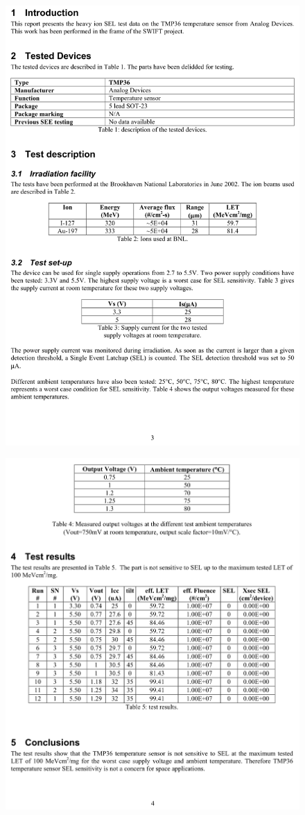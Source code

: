 \documentclass[
	12pt,				%
	openright,			%
	oneside,			%
	a4paper,			%
	english,			%
	french,				%
	spanish,			%
	brazil,				%
	oldfontcommands
	]{abntex2}
\begin{document}
\begin{anexosenv}
	\begin{figure}[th]
		\centering
		\includegraphics[width=0.85\linewidth]{./anexos/tmp36_3}	
	\end{figure}	
	
	\begin{figure}[th]
		\centering
		\includegraphics[width=0.85\linewidth]{./anexos/tmp36_4}	
	\end{figure}			
	

\end{anexosenv}
\end{document}
